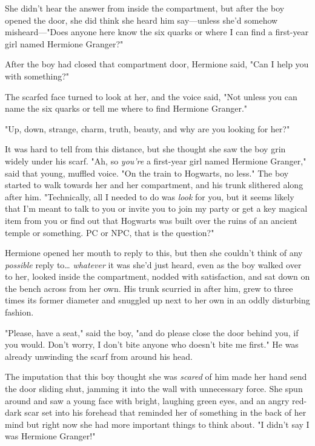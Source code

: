 She didn't hear the answer from inside the compartment, but after the boy
opened the door, she did think she heard him say---unless she'd somehow
misheard---"Does anyone here know the six quarks or where I can find a
first-year girl named Hermione Granger?"

After the boy had closed that compartment door, Hermione said, "Can I help you
with something?"

The scarfed face turned to look at her, and the voice said, "Not unless you can
name the six quarks or tell me where to find Hermione Granger."

"Up, down, strange, charm, truth, beauty, and why are you looking for her?"

It was hard to tell from this distance, but she thought she saw the boy grin
widely under his scarf. "Ah, so \emph{you're} a first-year girl named Hermione
Granger," said that young, muffled voice. "On the train to Hogwarts, no less."
The boy started to walk towards her and her compartment, and his trunk
slithered along after him. "Technically, all I needed to do was \emph{look} for
you, but it seems likely that I'm meant to talk to you or invite you to join my
party or get a key magical item from you or find out that Hogwarts was built
over the ruins of an ancient temple or something. PC or NPC, that is the
question?"

Hermione opened her mouth to reply to this, but then she couldn't think of any
\emph{possible} reply to{\ldots} \emph{whatever} it was she'd just heard, even
as the boy walked over to her, looked inside the compartment, nodded with
satisfaction, and sat down on the bench across from her own. His trunk scurried
in after him, grew to three times its former diameter and snuggled up next to
her own in an oddly disturbing fashion.

"Please, have a seat," said the boy, "and do please close the door behind you,
if you would. Don't worry, I don't bite anyone who doesn't bite me first." He
was already unwinding the scarf from around his head.

The imputation that this boy thought she was \emph{scared} of him made her hand
send the door sliding shut, jamming it into the wall with unnecessary force.
She spun around and saw a young face with bright, laughing green eyes, and an
angry red-dark scar set into his forehead that reminded her of something in the
back of her mind but right now she had more important things to think about. "I
didn't say I was Hermione Granger!"

